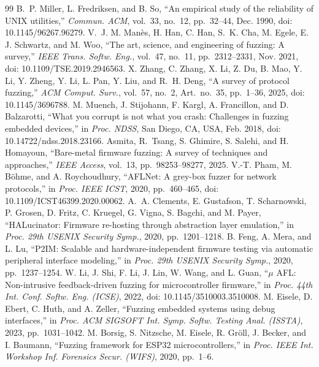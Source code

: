 \documentclass[10pt,letterpaper]{article}
\begin{document}
\begin{thebibliography}{99}
 B.~P. Miller, L. Fredriksen, and B. So, ``An empirical study of the reliability of UNIX utilities,'' \emph{Commun. ACM}, vol.~33, no.~12, pp.~32--44, Dec. 1990, doi: 10.1145/96267.96279.
 V.~J. M. Manès, H. Han, C. Han, S.~K. Cha, M. Egele, E. J. Schwartz, and M. Woo, ``The art, science, and engineering of fuzzing: A survey,'' \emph{IEEE Trans. Softw. Eng.}, vol.~47, no.~11, pp.~2312--2331, Nov. 2021, doi: 10.1109/TSE.2019.2946563.
 X. Zhang, C. Zhang, X. Li, Z. Du, B. Mao, Y. Li, Y. Zheng, Y. Li, L. Pan, Y. Liu, and R.~H. Deng, ``A survey of protocol fuzzing,'' \emph{ACM Comput. Surv.}, vol.~57, no.~2, Art.~no.~35, pp.~1--36, 2025, doi: 10.1145/3696788.
 M. Muench, J. Stijohann, F. Kargl, A. Francillon, and D. Balzarotti, ``What you corrupt is not what you crash: Challenges in fuzzing embedded devices,'' in \emph{Proc. NDSS}, San Diego, CA, USA, Feb. 2018, doi: 10.14722/ndss.2018.23166.
 Asmita, R.~Tsang, S. Ghimire, S. Salehi, and H. Homayoun, ``Bare-metal firmware fuzzing: A survey of techniques and approaches,'' \emph{IEEE Access}, vol.~13, pp.~98253--98277, 2025.
 V.-T. Pham, M. Böhme, and A. Roychoudhury, ``AFLNet: A grey-box fuzzer for network protocols,'' in \emph{Proc. IEEE ICST}, 2020, pp.~460--465, doi: 10.1109/ICST46399.2020.00062.
 A.~A. Clements, E. Gustafson, T. Scharnowski, P. Grosen, D. Fritz, C. Kruegel, G. Vigna, S. Bagchi, and M. Payer, ``HALucinator: Firmware re-hosting through abstraction layer emulation,'' in \emph{Proc. 29th USENIX Security Symp.}, 2020, pp.~1201--1218.
 B. Feng, A. Mera, and L. Lu, ``P2IM: Scalable and hardware-independent firmware testing via automatic peripheral interface modeling,'' in \emph{Proc. 29th USENIX Security Symp.}, 2020, pp.~1237--1254.
 W. Li, J. Shi, F. Li, J. Lin, W. Wang, and L. Guan, ``$\mu$ AFL: Non-intrusive feedback-driven fuzzing for microcontroller firmware,'' in \emph{Proc. 44th Int. Conf. Softw. Eng. (ICSE)}, 2022, doi: 10.1145/3510003.3510008.
 M. Eisele, D. Ebert, C. Huth, and A. Zeller, ``Fuzzing embedded systems using debug interfaces,'' in \emph{Proc. ACM SIGSOFT Int. Symp. Softw. Testing Anal. (ISSTA)}, 2023, pp.~1031--1042.
 M. Borsig, S. Nitzsche, M. Eisele, R. Gröll, J. Becker, and I. Baumann, ``Fuzzing framework for ESP32 microcontrollers,'' in \emph{Proc. IEEE Int. Workshop Inf. Forensics Secur. (WIFS)}, 2020, pp.~1--6.

\end{thebibliography}
\end{document}
